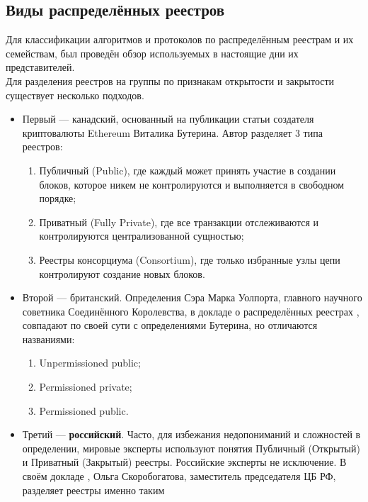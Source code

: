 \subsection{Виды распределённых реестров}\label{kinds_reestrs}
Для классификации алгоритмов и протоколов по распределённым реестрам и
их семействам, был проведён обзор используемых в настоящие дни их
представителей.\\
Для разделения реестров на группы по признакам открытости и закрытости
существует несколько подходов.
\begin{itemize}
    \item Первый --- канадский, основанный на публикации статьи
        \cite{VitalikButerin2015} создателя криптовалюты Ethereum Виталика
        Бутерина. Автор разделяет 3 типа реестров:
          \begin{enumerate}
              \item Публичный (Public), где каждый может принять участие в
                  создании блоков, которое никем не контролируются и
                  выполняется в свободном порядке;
              \item Приватный (Fully Private), где все транзакции отслеживаются
                  и контролируются централизованной сущностью;
              \item Реестры консорциума (Consortium), где только избранные узлы
                  цепи контролируют создание новых блоков.
          \end{enumerate}
     \item Второй --- британский. Определения Сэра Марка Уолпорта, главного
         научного советника Соединённого Королевства, в докладе о
         распределённых реестрах \cite{DeLeon2018}, совпадают по своей сути с определениями
         Бутерина, но отличаются названиями:
         \begin{enumerate}
                 \item Unpermissioned public;
                 \item Permissioned private;
                 \item Permissioned public.
         \end{enumerate}
     \item Третий --- \textbf{российский}. Часто, для избежания недопониманий и
         сложностей в определении, мировые эксперты используют понятия
         Публичный (Открытый) и Приватный (Закрытый) реестры. Российские
         эксперты не исключение. В своём докладе \cite{2016}, Ольга Скоробогатова,
         заместитель председателя ЦБ РФ, разделяет реестры именно таким

\end{itemize}
